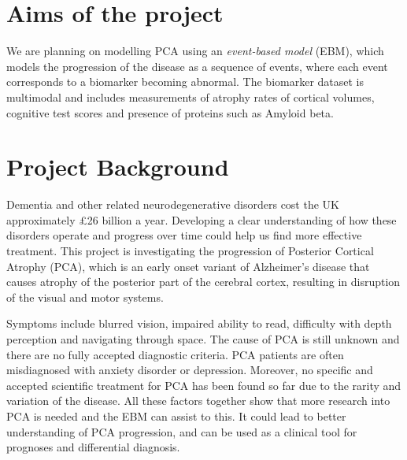\documentclass[12pt,a4paper,oneside]{report}
\begin{document}
\section*{Aims of the project}

We are planning on modelling PCA using an \textit{event-based model} (EBM), which models the progression of the disease as a sequence of events, where each event corresponds to a biomarker becoming abnormal. The biomarker dataset is multimodal and includes measurements of atrophy rates of cortical volumes, cognitive test scores and presence of proteins such as Amyloid beta.


\section*{Project Background}

Dementia and other related neurodegenerative disorders cost the UK approximately \pounds 26 billion a year. Developing a clear understanding of how these disorders operate and progress over time could help us find more effective treatment. This project is investigating the progression of Posterior Cortical Atrophy (PCA), which is an early onset variant of Alzheimer's disease that causes atrophy of the posterior part of the cerebral cortex, resulting in disruption of the visual and motor systems. 

Symptoms include blurred vision, impaired ability to read, difficulty with depth perception and navigating through space. The cause of PCA is still unknown and there are no fully accepted diagnostic criteria. PCA patients are often misdiagnosed with anxiety disorder or depression. Moreover, no specific and accepted scientific treatment for PCA has been found so far due to the rarity and variation of the disease.  All these factors together show that more research into PCA is needed and the EBM can assist to this. It could lead to better understanding of PCA progression, and can be used as a clinical tool for prognoses and differential diagnosis. 
\end{document}
